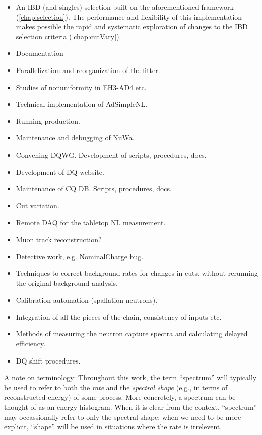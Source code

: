 \documentclass[../thesis.tex]{subfiles}
\begin{document}
\begin{itemize}
\item An IBD (and singles) selection \cite{IbdSel} built on the aforementioned framework (\autoref{chap:selection}). The performance and flexibility of this implementation makes possible the rapid and systematic exploration of changes to the IBD selection criteria (\autoref{chap:cutVary}).
\item Documentation
\item Parallelization and reorganization of the fitter.
\item Studies of nonuniformity in EH3-AD4 etc.
\item Technical implementation of AdSimpleNL.
\item Running production.
\item Maintenance and debugging of NuWa.
\item Convening DQWG. Development of scripts, procedures, docs.
\item Development of DQ website.
\item Maintenance of CQ DB. Scripts, procedures, docs.
\item Cut variation.
\item Remote DAQ for the tabletop NL measurement.
\item Muon track reconstruction?
\item Detective work, e.g. NominalCharge bug.
\item Techniques to correct background rates for changes in cuts, without rerunning the original background analysis.
\item Calibration automation (spallation neutrons).
\item Integration of all the pieces of the chain, consistency of inputs etc.
\item Methods of measuring the neutron capture spectra and calculating delayed efficiency.
\item DQ shift procedures.
\end{itemize}

A note on terminology: Throughout this work, the term ``spectrum'' will typically be used to refer to both the \emph{rate} and the \emph{spectral shape} (e.g., in terms of reconstructed energy) of some process. More concretely, a spectrum can be thought of as an energy histogram. When it is clear from the context, ``spectrum'' may occassionally refer to only the spectral shape; when we need to be more explicit, ``shape'' will be used in situations where the rate is irrelevent.
\end{document}
